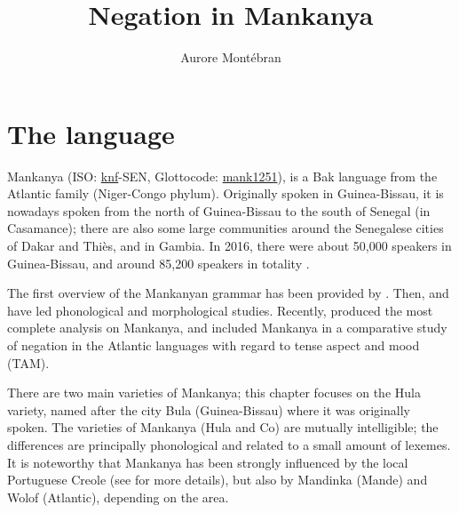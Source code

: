 \documentclass[output=paper,colorlinks,citecolor=brown]{langscibook}
\author{Aurore Montébran\affiliation{CNRS-LLACAN}}
\title{Negation in Mankanya}
\begin{document}
\maketitle 
\section{The language}\label{sec:mank:1}

Mankanya (ISO: \href{https://iso639-3.sil.org/code/knf}{knf}-{SEN}, Glottocode: \href{https://glottolog.org/resource/languoid/id/mank1251}{mank1251}),  is a Bak language from the Atlantic family (Niger-Congo phylum). Originally spoken in Guinea-Bissau, it is nowadays spoken from the north of Guinea-Bissau to the south of Senegal (in Casamance); there are also some large communities around the Senegalese cities of Dakar and Thiès, and in Gambia. In 2016, there were about 50,000 speakers in Guinea-Bissau, and around 85,200 speakers in totality \citep{EberhardEtAl2019}.

The first overview of the Mankanyan grammar has been provided by \citet{Trifcovič1969}. Then, \citet{Maliman2005} and \citet{Bayepar2013} have led phonological and morphological studies. Recently, \citet{Gaved2007,Gaved2015,Gaved2020} produced the most complete analysis on Mankanya, and \citet{Montébran2021} included Mankanya in a comparative study of negation in the Atlantic languages with regard to tense aspect and mood (TAM). 

There are two main varieties of Mankanya; this chapter focuses on the Hula variety, named after the city Bula (Guinea-Bissau) where it was originally spoken. The varieties of Mankanya (Hula and Co) are mutually intelligible; the differences are principally phonological and related to a small amount of lexemes. It is noteworthy that Mankanya has been strongly influenced by the local Portuguese Creole (see \citealt{Bayepar2013} for more details), but also by Mandinka (Mande) and Wolof (Atlantic), depending on the area.
\end{document}
